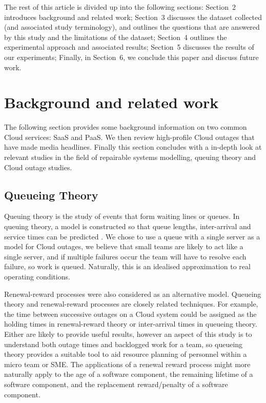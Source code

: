 \documentclass[5p]{elsarticle}
\begin{document}
The rest of this article is divided up into the following sections: Section~2 introduces background and related work; Section~3 discusses the dataset collected (and associated study terminology), and outlines the questions that are answered by this study and the limitations of the dataset; Section~4 outlines the experimental approach and associated results; Section~5 discusses the results of our experiments; Finally, in Section~6, we conclude this paper and discuss future work.

\section{Background and related work}

The following section provides some background information on two common Cloud services: SaaS and PaaS. We then review high-profile Cloud outages that have made media headlines. Finally this section concludes with a in-depth look at relevant studies in the field of repairable systems modelling, queuing theory and Cloud outage studies.

\subsection{Queueing Theory}

Queuing theory is the study of events that form waiting lines or queues. In queuing theory, a model is constructed so that queue lengths, inter-arrival and service times can be predicted \cite{kleinrock1975queuing, gross2008fundamentals, sundarapandian2009probability}. We chose to use a queue with a single server as a model for Cloud outages, we believe that small teams are likely to act like a single server, and if multiple failures occur the team will have to resolve each failure, so work is queued. Naturally, this is an idealised approximation to real operating conditions.

Renewal-reward processes \cite{blackwell1948renewal,jewell1967simple} were  also considered as an alternative model. Queueing theory and renewal-reward processes are closely related techniques.  For example, the time between successive outages on a Cloud system could be assigned as the holding times in renewal-reward theory or inter-arrival times in queueing theory. Either are likely to provide useful results, however an aspect of this study is to understand both outage times and backlogged work for a team, so queueing theory provides a suitable tool to aid resource planning of personnel within a micro team or SME.  The applications of a renewal reward process might more naturally apply to the age of a software component, the remaining lifetime of a software component, and the replacement reward/penalty of a software component.
\end{document}
